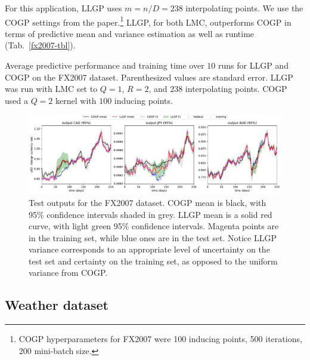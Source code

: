 \documentclass{article}
\begin{document}
For this application, LLGP uses $m=n/D=238$ interpolating points. We use the COGP settings from the paper.\footnote{COGP hyperparameters for FX2007 were 100 inducing points, 500 iterations, 200 mini-batch size.} LLGP, for both LMC, outperforms COGP in terms of predictive mean and variance estimation as well as runtime (Tab.~\ref{fx2007-tbl}).

\begin{table}[!ht]
  \caption{Average predictive performance and training time over $10$ runs for LLGP and COGP on the FX2007 dataset. Parenthesized values are standard error. LLGP was run with LMC set to $Q=1$, $R=2$, and $238$ interpolating points. COGP used a $Q=2$ kernel with $100$ inducing points.}
\label{fx2007-tbl}
\vskip 0.15in
\begin{center}
  \begin{small}
    \begin{sc}
      
\end{sc}
\end{small}
\end{center}
\vskip -0.1in
\end{table}

\begin{figure}[!ht]
\vskip 0.1in
\begin{center}
\centerline{\includegraphics[width=\textwidth]{fx2007graph.pdf}}
\caption{Test outputs for the FX2007 dataset. COGP mean is black, with 95\% confidence intervals shaded in grey. LLGP mean is a solid red curve, with light green 95\% confidence intervals. Magenta points are in the training set, while blue ones are in the test set. Notice LLGP variance corresponds to an appropriate level of uncertainty on the test set and certainty on the training set, as opposed to the uniform variance from COGP.}
\label{fx2007-graph}
\end{center}
\vskip -0.1in
\end{figure}

\subsection{Weather dataset}\label{large-bench}
\end{document}

